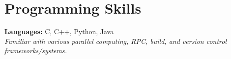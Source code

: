 \documentclass[10pt]{article}
\begin{document}
\vspace{-0.44em}

\section{Programming Skills}
\vspace{0.1em}
\textbf{Languages:} C, C++, Python, Java \\
\textit{Familiar with various parallel computing, RPC, build, and version control frameworks/systems.}
\end{document}
